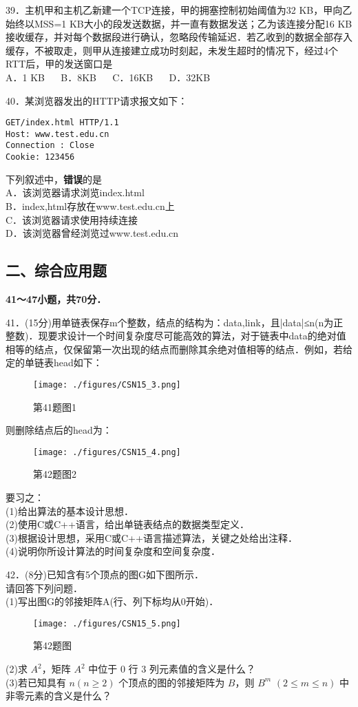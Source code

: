 39．主机甲和主机乙新建一个TCP连接，甲的拥塞控制初始阈值为32 KB，甲向乙始终以MSS=1 KB大小的段发送数据，并一直有数据发送；乙为该连接分配16 KB接收缓存，并对每个数据段进行确认，忽略段传输延迟．若乙收到的数据全部存入缓存，不被取走，则甲从连接建立成功时刻起，未发生超时的情况下，经过4个RTT后，甲的发送窗口是 \\
A．1 KB $\quad$ B．8KB $\quad$ C．16KB $\quad$ D．32KB

40．某浏览器发出的HTTP请求报文如下： \\
\begin{lstlisting}
GET/index.html HTTP/1.1
Host: www.test.edu.cn
Connection : Close
Cookie: 123456
\end{lstlisting}
下列叙述中，\textbf{错误}的是 \\
A．该浏览器请求浏览index.html \\
B．index,html存放在www.test.edu.cn上 \\
C．该浏览器请求使用持续连接 \\
D．该浏览器曾经浏览过www.test.edu.cn

\subsection{二、综合应用题}
\textbf{41～47小题，共70分．}

41．(15分)用单链表保存m个整数，结点的结构为：data,link，且|data|≤n(n为正整数)．现要求设计一个时间复杂度尽可能高效的算法，对于链表中data的绝对值相等的结点，仅保留第一次出现的结点而删除其余绝对值相等的结点．例如，若给定的单链表head如下：
\begin{figure}[ht]
\centering
\texttt{[image: ./figures/CSN15\_3.png]}
\caption{第41题图1} \label{CSN15_fig3}
\end{figure}
则删除结点后的head为：
\begin{figure}[ht]
\centering
\texttt{[image: ./figures/CSN15\_4.png]}
\caption{第42题图2} \label{CSN15_fig4}
\end{figure}
要习之： \\
(1)给出算法的基本设计思想． \\
(2)使用C或C++语言，给出单链表结点的数据类型定义． \\
(3)根据设计思想，采用C或C++语言描述算法，关键之处给出注释． \\
(4)说明你所设计算法的时间复杂度和空间复杂度．

42．(8分)已知含有5个顶点的图G如下图所示． \\
请回答下列问题． \\
(1)写出图G的邻接矩阵A(行、列下标均从0开始)．
\begin{figure}[ht]
\centering
\texttt{[image: ./figures/CSN15\_5.png]}
\caption{第42题图} \label{CSN15_fig5}
\end{figure}
(2)求 $A^2$，矩阵 $A^2$ 中位于 $0$ 行 $3$ 列元素值的含义是什么？ \\
(3)若已知具有 $n(n\geqslant2)$ 个顶点的图的邻接矩阵为 $B$，则 $B^m$ $(2\leqslant m\leqslant n)$ 中非零元素的含义是什么？

